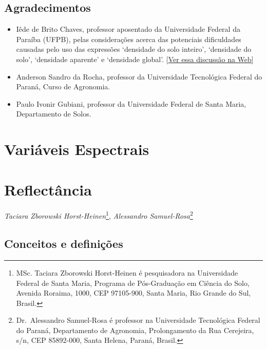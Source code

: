 \documentclass[
  a4paper,
  dvipsnames]{tufte-book}
\providecommand{\tightlist}{%
  \setlength{\itemsep}{0pt}\setlength{\parskip}{0pt}}
\begin{document}
\hypertarget{agradecimentos}{%
\section{Agradecimentos}\label{agradecimentos}}

\begin{itemize}
\tightlist
\item
  Iêde de Brito Chaves, professor aposentado da Universidade Federal da Paraíba (UFPB), pelas considerações acerca das potenciais dificuldades causadas pelo uso das expressões `densidade do solo inteiro', `densidade do solo', `densidade aparente' e `densidade global'. {[}\href{https://groups.google.com/d/msgid/soil-mapping/7c8745ca-243d-4d15-97cc-2d00cb5eefdd\%40googlegroups.com}{Ver essa discussão na Web}{]}
\item
  Anderson Sandro da Rocha, professor da Universidade Tecnológica Federal do Paraná, Curso de Agronomia.
\item
  Paulo Ivonir Gubiani, professor da Universidade Federal de Santa Maria, Departamento de Solos.
\end{itemize}

\hypertarget{variuxe1veis-espectrais}{%
\chapter*{Variáveis Espectrais}\label{variuxe1veis-espectrais}}

\hypertarget{reflectuxe2ncia}{%
\chapter{Reflectância}\label{reflectuxe2ncia}}

\emph{Taciara Zborowski Horst-Heinen}\footnote{MSc. Taciara Zborowski Horst-Heinen é pesquisadora na Universidade Federal de Santa Maria, Programa de Pós-Graduação em Ciência do Solo, Avenida Roraima, 1000, CEP 97105-900, Santa Maria, Rio Grande do Sul, Brasil.}, \emph{Alessandro Samuel-Rosa}\footnote{Dr.~Alessandro Samuel-Rosa é professor na Universidade Tecnológica Federal do Paraná, Departamento de Agronomia, Prolongamento da Rua Cerejeira, s/n, CEP 85892-000, Santa Helena, Paraná, Brasil.}

\hypertarget{conceitos-e-definiuxe7uxf5es-2}{%
\section{Conceitos e definições}\label{conceitos-e-definiuxe7uxf5es-2}}
\end{document}
